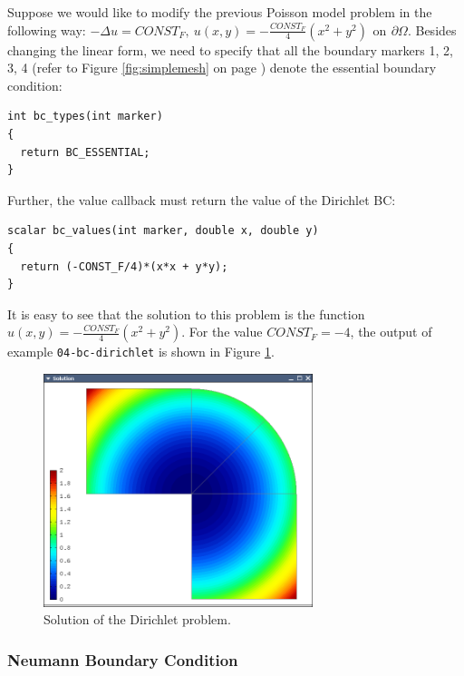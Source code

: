 \documentclass[11pt]{article}
\begin{document}
Suppose we would like to modify the previous Poisson model problem in the following way:
$-\Delta u = CONST_F,\ u(x,y) = -\frac{CONST_F}{4}(x^2 + y^2)\,\ \mbox{on}\,\ \partial \Omega.$
Besides changing the linear form, we need to specify that all the boundary markers 1, 2, 3, 4
(refer to Figure \ref{fig:simplemesh} on page \pageref{fig:simplemesh}) denote the essential
boundary condition:

\begin{lstlisting}
int bc_types(int marker)
{
  return BC_ESSENTIAL;
}
\end{lstlisting}

Further, the value callback must return the value of the Dirichlet BC:

\begin{lstlisting}
scalar bc_values(int marker, double x, double y)
{
  return (-CONST_F/4)*(x*x + y*y);
}
\end{lstlisting}

It is easy to see that the solution to this problem is the function
$u(x,y) = -\frac{CONST_F}{4}(x^2 + y^2)$. For the value $CONST_F = -4$,
the output of example {\tt 04-bc-dirichlet} is shown
in Figure \ref{fig:dirichlet}.

\begin{figure}[!ht]
  \centering\medskip
  \includegraphics[width=0.7\textwidth]{img/dirichlet.png}
  \caption{Solution of the Dirichlet problem.}
  \label{fig:dirichlet}
\end{figure}


\subsubsection{Neumann Boundary Condition}
\end{document}
